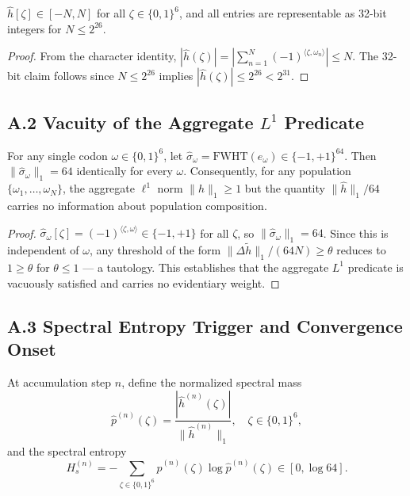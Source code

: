 \documentclass[11pt]{article}
\begin{document}
\begin{corollary}\label{cor:range}
$\hat{h}[\zeta] \in [-N, N]$ for all $\zeta \in \{0,1\}^6$, and
all entries are representable as 32-bit integers for $N \le 2^{26}$.
\end{corollary}

\begin{proof}
From the character identity,
$|\hat{h}(\zeta)| = |\sum_{n=1}^N (-1)^{\langle\zeta,\omega_n\rangle}| \le N$.
The 32-bit claim follows since $N \le 2^{26}$ implies $|\hat{h}(\zeta)| \le 2^{26} < 2^{31}$.
\end{proof}

\subsection*{A.2 \quad Vacuity of the Aggregate $L^1$ Predicate}

\begin{proposition}\label{prop:vacuous}
For any single codon $\omega \in \{0,1\}^6$, let
$\hat{\sigma}_\omega = \mathrm{FWHT}(e_\omega) \in \{-1,+1\}^{64}$.  Then
$\|\hat{\sigma}_\omega\|_1 = 64$ identically for every $\omega$.
Consequently, for any population $\{\omega_1,\ldots,\omega_N\}$,
the aggregate $\ell^1$ norm $\|\hat{h}\|_1 \ge 1$ but the quantity
$\|\hat{h}\|_1 / 64$ carries no information about population composition.
\end{proposition}

\begin{proof}
$\hat{\sigma}_\omega[\zeta] = (-1)^{\langle \zeta,\omega\rangle} \in \{-1,+1\}$
for all $\zeta$, so $\|\hat{\sigma}_\omega\|_1 = 64$.  Since this is
independent of $\omega$, any threshold of the form
$\|\Delta\tilde{h}\|_1 / (64N) \ge \theta$ reduces to $1 \ge \theta$
for $\theta \le 1$ — a tautology.  This establishes that the aggregate
$L^1$ predicate is vacuously satisfied and carries no evidentiary weight.
\end{proof}

\subsection*{A.3 \quad Spectral Entropy Trigger and Convergence Onset}

\begin{definition}\label{def:Hs}
At accumulation step $n$, define the normalized spectral mass
\[
  \hat{p}^{(n)}(\zeta)
  = \frac{|\hat{h}^{(n)}(\zeta)|}{\|\hat{h}^{(n)}\|_1}, \quad
  \zeta \in \{0,1\}^6,
\]
and the spectral entropy
\[
  H_s^{(n)} = -\sum_{\zeta \in \{0,1\}^6}
    \hat{p}^{(n)}(\zeta) \log \hat{p}^{(n)}(\zeta) \in [0, \log 64].
\]
\end{definition}
\end{document}
